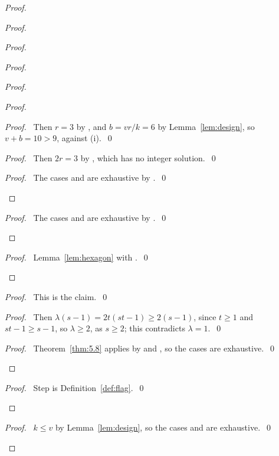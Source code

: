\begin{proof}
\begin{proof}
\begin{proof}
\begin{proof}
\begin{proof}
\begin{proof}
      \begin{proof}\pf\ Then $r=3$ by , and $b=vr/k=6$ by
       Lemma~\ref{lem:design}, so $v+b=10>9$, against (i).~\qed\end{proof}
      \begin{proof}\pf\ Then $2r=3$ by , which has no integer
       solution.~\qed\end{proof}
      \qedstep
      \begin{proof}\pf\ The cases  and  are
       exhaustive by .~\qed\end{proof}
     \end{proof}
     \qedstep
     \begin{proof}\pf\ The cases  and  are exhaustive by
      .~\qed\end{proof}
    \end{proof}
    \qedstep
    \begin{proof}\pf\ Lemma~\ref{lem:hexagon} with .~\qed\end{proof}
   \end{proof}
   \begin{proof}\pf\ This is the claim.~\qed\end{proof}
   \begin{proof}\pf\ Then $\lambda(s-1)=2t(st-1)\ge2(s-1)$, since $t\ge1$ and $st-1\ge s-1$, so
    $\lambda\ge2$, as $s\ge2$; this contradicts $\lambda=1$.~\qed\end{proof}
   \qedstep
   \begin{proof}\pf\ Theorem~\ref{thm:5.8} applies by  and , so the
    cases are exhaustive.~\qed\end{proof}
  \end{proof}
  \qedstep
  \begin{proof}\pf\ Step  is Definition~\ref{def:flag}.~\qed\end{proof}
 \end{proof}
 \qedstep
 \begin{proof}\pf\ $k\le v$ by Lemma~\ref{lem:design}, so the cases  and
   are exhaustive.~\qed\end{proof}
\end{proof}

